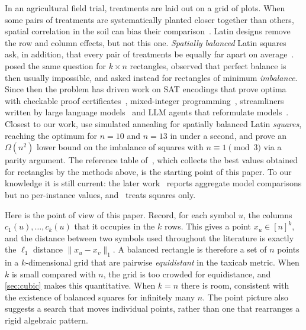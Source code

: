 \documentclass[11pt]{article}
\theoremstyle{plain}
\theoremstyle{definition}
\theoremstyle{remark}
\begin{document}
In an agricultural field trial, treatments are laid out on a grid of plots. When some pairs of
treatments are systematically planted closer together than others, spatial correlation in the
soil can bias their comparison~\citep{vanEs1993}. Latin designs remove the row and column
effects, but not this one. \emph{Spatially balanced} Latin squares ask, in addition, that every
pair of treatments be equally far apart on average~\citep{GomesSellmann2004,LeBrasGomesSelman2012}.
\citet{DiazLeBrasGomes2017} posed the same question for $k\times n$ rectangles, observed that
perfect balance is then usually impossible, and asked instead for rectangles of minimum
\emph{imbalance}. Since then the problem has driven work on SAT encodings that prove optima with checkable
proof certificates~\citep{RamaswamySzeider2023}, mixed-integer programming~\citep{MirkaEtAl2023},
streamliners written by large language models~\citep{VoborilRamaswamySzeider2025} and LLM agents
that reformulate models~\citep{VoborilSzeider2026}. Closest to our work, \citet{XiaEtAl2026} use
simulated annealing for spatially balanced Latin \emph{squares}, reaching the optimum for $n=10$
and $n=13$ in under a second, and prove an $\Omega(n^2)$ lower bound on the imbalance of squares
with $n\equiv1\pmod 3$ via a parity argument. The reference table
of~\citet{VoborilRamaswamySzeider2025}, which collects the best values obtained for rectangles by
the methods above, is the starting point of this paper. To our knowledge it is still current: the
later work~\citep{VoborilSzeider2026} reports aggregate model comparisons but no per-instance
values, and~\citep{XiaEtAl2026} treats squares only.

Here is the point of view of this paper. Record, for each symbol $u$, the columns
$c_1(u),\dots,c_k(u)$ that it occupies in the $k$ rows. This gives a point
$x_u\in[n]^k$, and the distance between two symbols used throughout the literature is exactly
the $\ell_1$ distance $\lVert x_u-x_v\rVert_1$. A balanced rectangle is therefore a set of $n$
points in a $k$-dimensional grid that are pairwise \emph{equidistant} in the taxicab metric.
When $k$ is small compared with $n$, the grid is too crowded for equidistance, and
\cref{sec:cubic} makes this quantitative. When $k=n$ there is room, consistent with the existence
of balanced squares for infinitely many $n$. The point picture also suggests a search that moves
individual points, rather than one that rearranges a rigid algebraic pattern.
\end{document}
